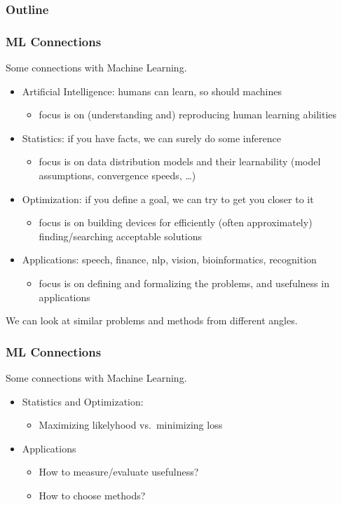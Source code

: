 \documentclass[usenames,dvipsnames]{beamer}
\author[Chrupala and Stroppa]{Grzegorz Chrupa{\l}a and Nicolas Stroppa}
\institute[]  %
{
Saarland University\\
Google
}
\date[2010] %
{META Workshop}
\begin{document}
\frame{\titlepage}

\begin{frame}
  \frametitle{Outline}
  \tableofcontents
\end{frame}


\begin{frame}\frametitle{ML Connections}

Some connections with Machine Learning.
\begin{itemize}
\item Artificial Intelligence:  humans can learn, so should machines
\begin{itemize}
\item focus is on (understanding and) reproducing human learning abilities
\end{itemize}
\item Statistics:  if you have facts, we can surely do some inference
\begin{itemize}
\item focus is on data distribution models and their learnability
  (model assumptions, convergence speeds, \ldots)
\end{itemize}
\item Optimization: if you define a goal, we can try to get you
  closer to it
\begin{itemize}
\item focus is on building devices for efficiently (often
  approximately) finding/searching acceptable solutions
\end{itemize}
\item Applications: speech, finance, nlp, vision, bioinformatics, recognition
\begin{itemize}
\item focus is on defining and formalizing the problems, and usefulness in applications
\end{itemize}
\end{itemize}

\vspace{0.4cm}
We can look at similar problems and methods from different angles.
\end{frame}


\begin{frame}\frametitle{ML Connections}
Some connections with Machine Learning.
 \begin{itemize}
\item Statistics and Optimization:
\begin{itemize}
\item Maximizing likelyhood vs.\ minimizing loss
\end{itemize}
\item Applications
\begin{itemize}
\item How to measure/evaluate usefulness?
\item How to choose methods?
\end{itemize}
\end{itemize}

\end{frame}
\end{document}
